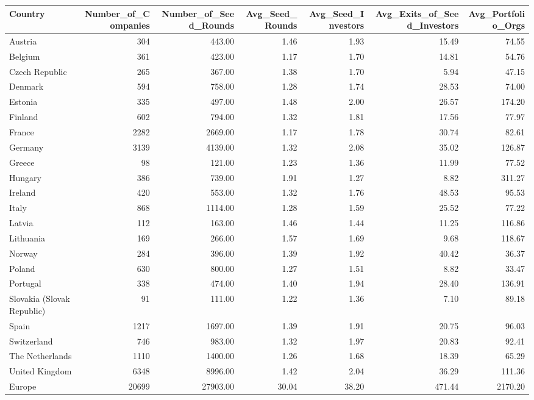 \begin{tabular}{lrrrrrr}
  \toprule
Country & Number_of_Companies & Number_of_Seed_Rounds & Avg_Seed_Rounds & Avg_Seed_Investors & Avg_Exits_of_Seed_Investors & Avg_Portfolio_Orgs \\ 
  \midrule
Austria & 304 & 443.00 & 1.46 & 1.93 & 15.49 & 74.55 \\ 
  Belgium & 361 & 423.00 & 1.17 & 1.70 & 14.81 & 54.76 \\ 
  Czech Republic & 265 & 367.00 & 1.38 & 1.70 & 5.94 & 47.15 \\ 
  Denmark & 594 & 758.00 & 1.28 & 1.74 & 28.53 & 74.00 \\ 
  Estonia & 335 & 497.00 & 1.48 & 2.00 & 26.57 & 174.20 \\ 
  Finland & 602 & 794.00 & 1.32 & 1.81 & 17.56 & 77.97 \\ 
  France & 2282 & 2669.00 & 1.17 & 1.78 & 30.74 & 82.61 \\ 
  Germany & 3139 & 4139.00 & 1.32 & 2.08 & 35.02 & 126.87 \\ 
  Greece &  98 & 121.00 & 1.23 & 1.36 & 11.99 & 77.52 \\ 
  Hungary & 386 & 739.00 & 1.91 & 1.27 & 8.82 & 311.27 \\ 
  Ireland & 420 & 553.00 & 1.32 & 1.76 & 48.53 & 95.53 \\ 
  Italy & 868 & 1114.00 & 1.28 & 1.59 & 25.52 & 77.22 \\ 
  Latvia & 112 & 163.00 & 1.46 & 1.44 & 11.25 & 116.86 \\ 
  Lithuania & 169 & 266.00 & 1.57 & 1.69 & 9.68 & 118.67 \\ 
  Norway & 284 & 396.00 & 1.39 & 1.92 & 40.42 & 36.37 \\ 
  Poland & 630 & 800.00 & 1.27 & 1.51 & 8.82 & 33.47 \\ 
  Portugal & 338 & 474.00 & 1.40 & 1.94 & 28.40 & 136.91 \\ 
  Slovakia (Slovak Republic) &  91 & 111.00 & 1.22 & 1.36 & 7.10 & 89.18 \\ 
  Spain & 1217 & 1697.00 & 1.39 & 1.91 & 20.75 & 96.03 \\ 
  Switzerland & 746 & 983.00 & 1.32 & 1.97 & 20.83 & 92.41 \\ 
  The Netherlands & 1110 & 1400.00 & 1.26 & 1.68 & 18.39 & 65.29 \\ 
  United Kingdom & 6348 & 8996.00 & 1.42 & 2.04 & 36.29 & 111.36 \\ 
  Europe & 20699 & 27903.00 & 30.04 & 38.20 & 471.44 & 2170.20 \\ 
   \bottomrule
\end{tabular}
